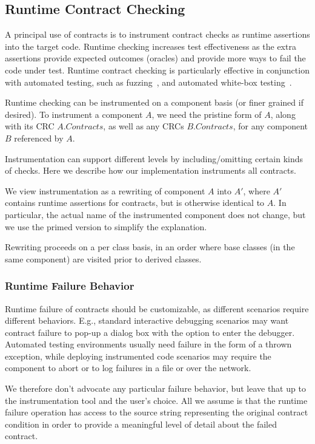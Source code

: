 \documentclass{sig-alternate}
\begin{document}
\subsection{Runtime Contract Checking}
\noindent
A principal use of contracts is to instrument contract checks as
runtime assertions into the target code. Runtime checking increases
test effectiveness as the extra assertions provide expected outcomes
(oracles) and provide more ways to fail the code under test. Runtime
contract checking is particularly effective in conjunction with
automated testing, such as fuzzing~\cite{DBLP:journals/tse/Korel90,DBLP:conf/popl/Godefroid07}, and automated white-box testing~\cite{DBLP:journals/cacm/King76,DBLP:conf/kbse/GuptaMS00,DBLP:conf/tap/TillmannH08}.

Runtime checking can be instrumented on a component basis (or finer grained
if desired). To instrument a component $A$, we need the pristine form
of $A$, along with its CRC $A.Contracts$, as well as any CRCs
$B.Contracts$, for any component $B$ referenced by $A$.

Instrumentation can support different levels by including/omitting
certain kinds of checks. Here we describe how our implementation
instruments all contracts.

We view instrumentation as a rewriting of component $A$ into $A'$,
where $A'$ contains runtime assertions for contracts, but is otherwise
identical to $A$. In particular, the actual name of the instrumented
component does not change, but we use the primed version to simplify
the explanation. 

Rewriting proceeds on a per class basis, in an order where base
classes (in the same component) are visited prior to derived classes. 

\subsubsection{Runtime Failure Behavior}
\noindent
Runtime failure of contracts should be customizable, as different
scenarios require different behaviors. E.g., standard interactive
debugging scenarios may want contract failure to pop-up a dialog box
with the option to enter the debugger. Automated testing environments
usually need failure in the form of a thrown exception, while
deploying instrumented code scenarios may require the component to
abort or to log failures in a file or over the network.

We therefore don't advocate any particular failure behavior, but leave
that up to the instrumentation tool and the user's choice. All we
assume is that the runtime failure operation has access to the source
string representing the original contract condition in order to
provide a meaningful level of detail about the failed contract.
\end{document}
